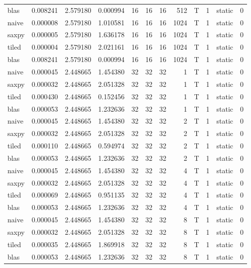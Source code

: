 \documentclass[
  12pt,
  xcolor = usenames,dvipsnames]{article}
\begin{document}
\begin{table}[!h]
{\begin{tabular}[t]{lrrrrrrrlrlr}
blas & 0.008241 & 2.579180 & 0.000994 & 16 & 16 & 16 & 512 & T & 1 & static & 0\\
naive & 0.000008 & 2.579180 & 1.010581 & 16 & 16 & 16 & 1024 & T & 1 & static & 0\\
saxpy & 0.000005 & 2.579180 & 1.636178 & 16 & 16 & 16 & 1024 & T & 1 & static & 0\\
tiled & 0.000004 & 2.579180 & 2.021161 & 16 & 16 & 16 & 1024 & T & 1 & static & 0\\
\addlinespace
blas & 0.008241 & 2.579180 & 0.000994 & 16 & 16 & 16 & 1024 & T & 1 & static & 0\\
naive & 0.000045 & 2.448665 & 1.454380 & 32 & 32 & 32 & 1 & T & 1 & static & 0\\
saxpy & 0.000032 & 2.448665 & 2.051328 & 32 & 32 & 32 & 1 & T & 1 & static & 0\\
tiled & 0.000430 & 2.448665 & 0.152456 & 32 & 32 & 32 & 1 & T & 1 & static & 0\\
blas & 0.000053 & 2.448665 & 1.232636 & 32 & 32 & 32 & 1 & T & 1 & static & 0\\
\addlinespace
naive & 0.000045 & 2.448665 & 1.454380 & 32 & 32 & 32 & 2 & T & 1 & static & 0\\
saxpy & 0.000032 & 2.448665 & 2.051328 & 32 & 32 & 32 & 2 & T & 1 & static & 0\\
tiled & 0.000110 & 2.448665 & 0.594974 & 32 & 32 & 32 & 2 & T & 1 & static & 0\\
blas & 0.000053 & 2.448665 & 1.232636 & 32 & 32 & 32 & 2 & T & 1 & static & 0\\
naive & 0.000045 & 2.448665 & 1.454380 & 32 & 32 & 32 & 4 & T & 1 & static & 0\\
\addlinespace
saxpy & 0.000032 & 2.448665 & 2.051328 & 32 & 32 & 32 & 4 & T & 1 & static & 0\\
tiled & 0.000069 & 2.448665 & 0.951135 & 32 & 32 & 32 & 4 & T & 1 & static & 0\\
blas & 0.000053 & 2.448665 & 1.232636 & 32 & 32 & 32 & 4 & T & 1 & static & 0\\
naive & 0.000045 & 2.448665 & 1.454380 & 32 & 32 & 32 & 8 & T & 1 & static & 0\\
saxpy & 0.000032 & 2.448665 & 2.051328 & 32 & 32 & 32 & 8 & T & 1 & static & 0\\
\addlinespace
tiled & 0.000035 & 2.448665 & 1.869918 & 32 & 32 & 32 & 8 & T & 1 & static & 0\\
blas & 0.000053 & 2.448665 & 1.232636 & 32 & 32 & 32 & 8 & T & 1 & static & 0\\

\end{tabular}}
\end{table}
\end{document}
